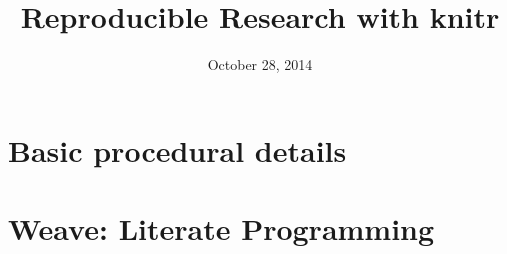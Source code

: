 \documentclass[12pt]{beamer} %
\title{Reproducible Research with knitr}
\date[]{October 28, 2014}
\begin{document}
\frame{\titlepage}

\frame{\tableofcontents}

\section{Basic procedural details}
\frame{\tableofcontents[currentsection]}

\section{Weave: Literate Programming}
\frame{\tableofcontents[currentsection]}




\appendix
\frame{}
\end{document}
